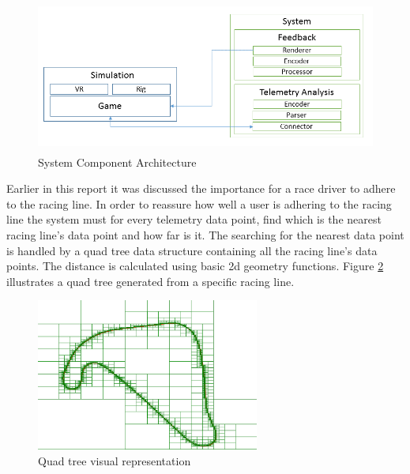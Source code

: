 \documentclass{article}
\begin{document}
\begin{figure}[!htb]
	\centering
	\includegraphics[height=5cm]{SystemArc}
	\caption{System Component Architecture}
	\label{fig:SystemComponentArchitecture}
\end{figure}

Earlier in this report it was discussed the importance for a race driver to adhere to the racing line. In order to reassure how well a user is adhering to the racing line the system must for every telemetry data point, find which is the nearest racing line's data point and how far is it. The searching for the nearest data point is handled by a quad tree data structure containing all the racing line's data points. The distance is calculated using basic 2d geometry functions. Figure \ref{fig:QuadTree} illustrates a quad tree generated from a specific racing line. 

\begin{figure}[!htb]
	\centering
	\includegraphics[height=5cm]{QuadTree}
	\caption{Quad tree visual representation}
	\label{fig:QuadTree}
\end{figure}
\end{document}
